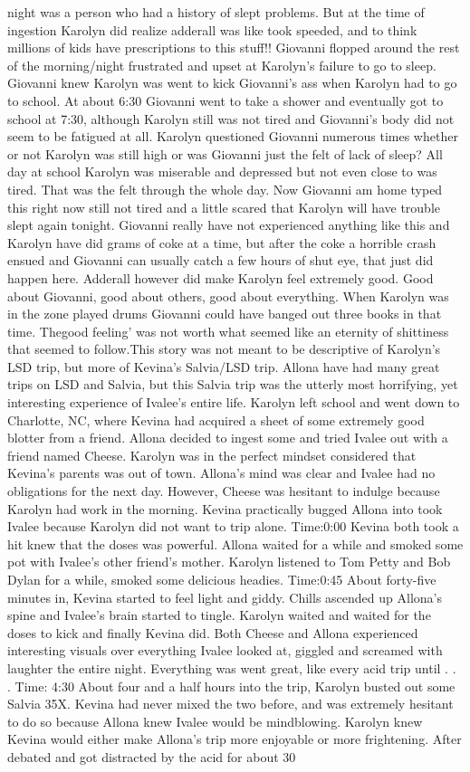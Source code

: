 \documentclass[12pt]{book}
\begin{document}
night was a person who had a history of slept problems. But at the time of ingestion Karolyn did realize adderall was like took speeded, and to think millions of kids have prescriptions to this stuff!! Giovanni flopped around the rest of the morning/night frustrated and upset at Karolyn's failure to go to sleep. Giovanni knew Karolyn was went to kick Giovanni's ass when Karolyn had to go to school. At about 6:30 Giovanni went to take a shower and eventually got to school at 7:30, although Karolyn still was not tired and Giovanni's body did not seem to be fatigued at all. Karolyn questioned Giovanni numerous times whether or not Karolyn was still high or was Giovanni just the felt of lack of sleep? All day at school Karolyn was miserable and depressed but not even close to was tired. That was the felt through the whole day. Now Giovanni am home typed this right now still not tired and a little scared that Karolyn will have trouble slept again tonight. Giovanni really have not experienced anything like this and Karolyn have did grams of coke at a time, but after the coke a horrible crash ensued and Giovanni can usually catch a few hours of shut eye, that just did happen here. Adderall however did make Karolyn feel extremely good. Good about Giovanni, good about others, good about everything. When Karolyn was in the zone played drums Giovanni could have banged out three books in that time. Thegood feeling' was not worth what seemed like an eternity of shittiness that seemed to follow.This story was not meant to be descriptive of Karolyn's LSD trip, but more of Kevina's Salvia/LSD trip. Allona have had many great trips on LSD and Salvia, but this Salvia trip was the utterly most horrifying, yet interesting experience of Ivalee's entire life. Karolyn left school and went down to Charlotte, NC, where Kevina had acquired a sheet of some extremely good blotter from a friend. Allona decided to ingest some and tried Ivalee out with a friend named Cheese. Karolyn was in the perfect mindset considered that Kevina's parents was out of town. Allona's mind was clear and Ivalee had no obligations for the next day. However, Cheese was hesitant to indulge because Karolyn had work in the morning. Kevina practically bugged Allona into took Ivalee because Karolyn did not want to trip alone. Time:0:00 Kevina both took a hit knew that the doses was powerful. Allona waited for a while and smoked some pot with Ivalee's other friend's mother. Karolyn listened to Tom Petty and Bob Dylan for a while, smoked some delicious headies. Time:0:45 About forty-five minutes in, Kevina started to feel light and giddy. Chills ascended up Allona's spine and Ivalee's brain started to tingle. Karolyn waited and waited for the doses to kick and finally Kevina did. Both Cheese and Allona experienced interesting visuals over everything Ivalee looked at, giggled and screamed with laughter the entire night. Everything was went great, like every acid trip until . . .  Time: 4:30 About four and a half hours into the trip, Karolyn busted out some Salvia 35X. Kevina had never mixed the two before, and was extremely hesitant to do so because Allona knew Ivalee would be mindblowing. Karolyn knew Kevina would either make Allona's trip more enjoyable or more frightening. After debated and got distracted by the acid for about 30 
\end{document}
